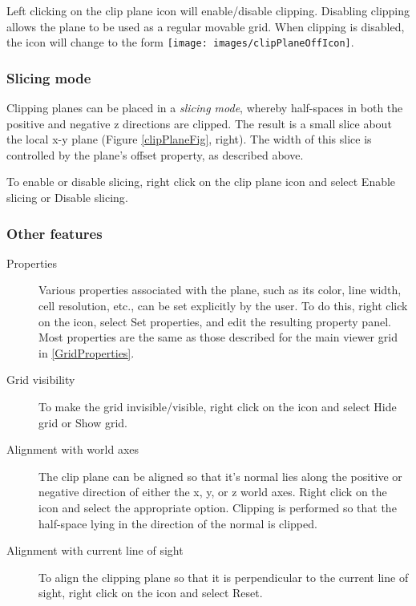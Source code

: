 \documentclass{article}
\begin{document}
Left clicking on the clip plane icon will enable/disable
clipping. Disabling clipping allows the plane to be used as a regular
movable grid. When clipping is disabled, the icon
will change to the form
\texttt{[image: images/clipPlaneOffIcon]}.

\subsubsection{Slicing mode}

Clipping planes can be placed in a {\it slicing mode}, whereby half-spaces
in both the positive and negative z directions are clipped. The result
is a small slice about the local x-y plane (Figure \ref{clipPlaneFig},
right). The width of this slice is controlled by the plane's {\sf offset}
property, as described above.

To enable or disable slicing, right click on the clip plane icon
and select {\sf Enable slicing} or {\sf Disable slicing}.

\subsubsection{Other features}

\begin{description}

\item[Properties]\mbox{}

Various properties associated with the plane, such as its color, line
width, cell resolution, etc., can be set explicitly by the user. To do
this, right click on the icon, select {\sf Set properties}, and edit
the resulting property panel.  Most properties are the same as those
described for the main viewer grid in \ref{GridProperties}.

\item[Grid visibility]\mbox{}

To make the grid invisible/visible, right click on the icon
and select {\sf Hide grid} or {\sf Show grid}.

\item[Alignment with world axes]\mbox{}

The clip plane can be aligned so that it's
normal lies along the positive or negative direction of either the x,
y, or z world axes. Right click on the icon and select the
appropriate option. Clipping is performed so that
the half-space lying in the direction of the normal is clipped.

\item[Alignment with current line of sight]\mbox{}

To align the clipping plane so that it is perpendicular to the
current line of sight, right click on the icon and select {\sf Reset}.

\end{description}
\end{document}
